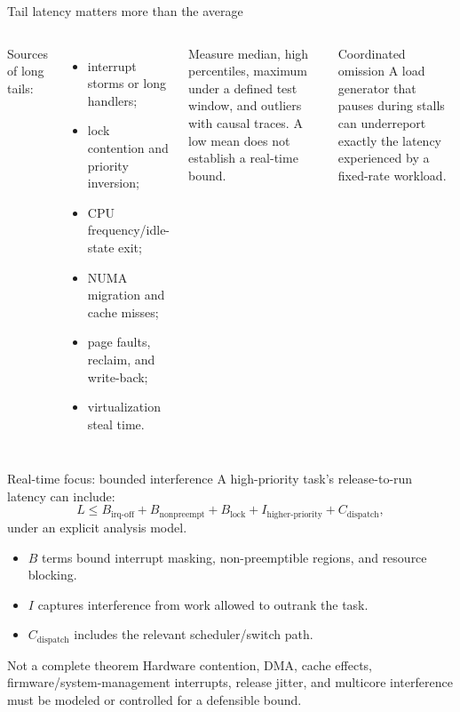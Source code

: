 \documentclass[aspectratio=169,11pt]{beamer}
\begin{document}
\begin{frame}{Tail latency matters more than the average}
  \begin{columns}[T,onlytextwidth]
      Sources of long tails:
      \begin{itemize}
        \item interrupt storms or long handlers;
        \item lock contention and priority inversion;
        \item CPU frequency/idle-state exit;
        \item NUMA migration and cache misses;
        \item page faults, reclaim, and write-back;
        \item virtualization steal time.
      \end{itemize}
      \begin{tcolorbox}[title=Report distributions]
        Measure median, high percentiles, maximum under a defined test window, and outliers with causal traces. A low mean does not establish a real-time bound.
      \end{tcolorbox}
      \begin{alertblock}{Coordinated omission}
        A load generator that pauses during stalls can underreport exactly the latency experienced by a fixed-rate workload.
      \end{alertblock}
  \end{columns}
\end{frame}

\begin{frame}{Real-time focus: bounded interference}
  A high-priority task's release-to-run latency can include:
  \[
    L \leq B_{\text{irq-off}} + B_{\text{nonpreempt}}
      + B_{\text{lock}} + I_{\text{higher-priority}} + C_{\text{dispatch}},
  \]
  under an explicit analysis model.
  \begin{itemize}
    \item $B$ terms bound interrupt masking, non-preemptible regions, and resource blocking.
    \item $I$ captures interference from work allowed to outrank the task.
    \item $C_{\text{dispatch}}$ includes the relevant scheduler/switch path.
  \end{itemize}
  \begin{alertblock}{Not a complete theorem}
    Hardware contention, DMA, cache effects, firmware/system-management interrupts, release jitter, and multicore interference must be modeled or controlled for a defensible bound.
  \end{alertblock}
\end{frame}
\end{document}
